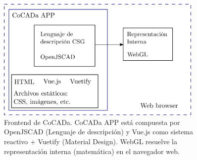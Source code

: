 \begin{figure}[h]
    \includegraphics[width=10cm]{Img/Desarrollo/front.png}
    \centering
    \caption{\footnotesize{Frontend de CoCADa. CoCADa APP está compuesta por OpenJSCAD (Lenguaje de descripción) y Vue.js como sistema reactivo + Vuetify (Material Design). WebGL resuelve la representación interna (matemática) en el navegador web.}}
    \label{fig:front}
\end{figure}

